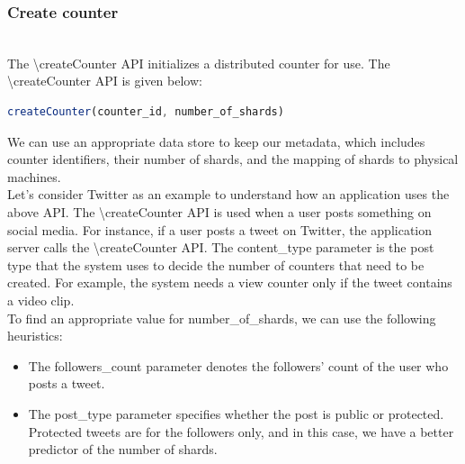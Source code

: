 \subsubsection{Create counter}\label{jaPHT5qkpAAcA5yq7WS4u}
\\
The \textbackslash{createCounter} API initializes a distributed counter for use. The \textbackslash{createCounter} API is given below:

\begin{lstlisting}[language=JavaScript]
createCounter(counter_id, number_of_shards)
\end{lstlisting}

\begin{table}[htbp]
\centering
\small
{}
\end{table}

We can use an appropriate data store to keep our metadata, which includes counter identifiers, their number of shards, and the mapping of shards to physical machines.
\\
Let's consider Twitter as an example to understand how an application uses the above API. The
\textbackslash{createCounter} API is used when a user posts something on social media. For instance, if a user posts a tweet on Twitter, the application server calls the \textbackslash{createCounter} API. The content\_type parameter is the post type that the system uses to decide the number of counters that need to be created. For example, the system needs a view counter only if the tweet contains a video clip.
\\
To find an appropriate value for number\_of\_shards, we can use the following heuristics:

\begin{itemize}
\item
\protect{}\label{LkAgv8aPFupeMZKmUowAl}
The followers\_count parameter denotes the followers' count of the user who posts a tweet.
\item
\protect{}\label{oJfYtiAjBleQGG5Bge36H}
The post\_type parameter specifies whether the post is public or protected. Protected tweets are for the followers only, and in this case, we have a better predictor of the number of shards.
\end{itemize}

